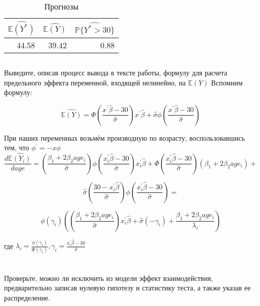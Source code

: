 \documentclass[a4paper,12pt]{article}
\def \hb{\hat{\beta}}
\def \hb{\hat{\beta}}
\def \mbb{\mathbb}
\def \P{\mbb{P}}
\def \E{\mbb{E}}
\def \b{\beta}
\begin{document}
\begin{table}[ht]
\centering
\begin{tabular}{|rrr|}
	\hline
	$ \hat{\E(Y^*)} $ & $ \hat{\E(Y)} $ & $ \hat{\P\{Y^* > 30\}} $ \\ 
	\hline
	 44.58 & 39.42 & 0.88 \\ 
	\hline
\end{tabular}
\caption{Прогнозы}
\end{table}

\subsection{}
\Sun Выведите, описав процесс вывода в тексте работы, формулу для расчета
предельного эффекта переменной, входящей нелинейно, на
$ \E(Y) $
Вспомним формулу:

\[  \hat{\E(Y)} = \Phi\left( \frac{x^\prime \hb - 30}{\hat{\sigma}} \right) x^\prime \hb + \hat{\sigma} \phi\left( \frac{x^\prime \hb - 30}{\hat{\sigma}} \right) 
 \]
 
При наших переменных возьмём производную по возрасту, воспользовавшись тем, что $ \phi^\prime = -x\phi $
\[ \frac{d\hat{\E(Y_i)}}{d age} = \left( \frac{\b_1 + 2 \b_2 age_i}{\hat{\sigma}} \right) \phi \left(\frac{x_i^\prime \hb - 30}{\hat{\sigma}} \right) x_i^\prime \hb + \Phi \left(\frac{x_i^\prime \hb - 30}{\hat{\sigma}} \right)   (\b_1 + 2 \b_2 age_i) +\] 

\[  \hat{\sigma} \left(\frac{30 - x_i^\prime \hb}{\hat{\sigma}}\right) \phi \left(\frac{x_i^\prime \hb - 30}{\hat{\sigma}} \right) = \]

\[\phi \left(\gamma_i \right) \left( \left( \frac{\b_1 + 2 \b_2 age_i}{\hat{\sigma}} \right)  x_i^\prime \hb + \hat{\sigma} \left( -\gamma_i \right) + \frac{\b_1 + 2 \b_2 age_i}{\lambda_i} \right) \]

где $ \lambda_i = \frac{\phi \left(\gamma_i\right) }{\Phi \left( \gamma_i \right) }, \gamma_i = \frac{x_i^\prime \hb - 30}{\hat{\sigma}} $




\section{}

\subsection{}
\Sun Проверьте, можно ли исключить из модели эффект взаимодействия,
предварительно записав нулевую гипотезу и статистику теста, а также указав ее
распределение.
\end{document}
